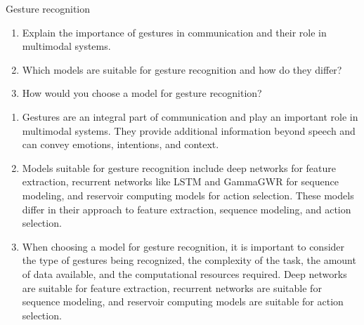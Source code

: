 \documentclass{article}
\begin{document}
\begin{exercise}{Gesture recognition}
  \begin{enumerate}
    \item Explain the importance of gestures in communication and their role in multimodal systems.
    \item Which models are suitable for gesture recognition and how do they differ?
    \item How would you choose a model for gesture recognition?
  \end{enumerate}

  \begin{solution}
    \begin{enumerate}
      \item Gestures are an integral part of communication and play an important role in multimodal systems. They provide additional information beyond speech and can convey emotions, intentions, and context.
      \item Models suitable for gesture recognition include deep networks for feature extraction, recurrent networks like LSTM and GammaGWR for sequence modeling, and reservoir computing models for action selection. These models differ in their approach to feature extraction, sequence modeling, and action selection.
      \item When choosing a model for gesture recognition, it is important to consider the type of gestures being recognized, the complexity of the task, the amount of data available, and the computational resources required. Deep networks are suitable for feature extraction, recurrent networks are suitable for sequence modeling, and reservoir computing models are suitable for action selection.
    \end{enumerate}
  \end{solution}
\end{exercise}
\end{document}

